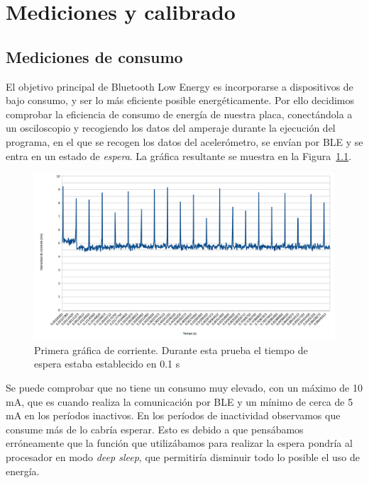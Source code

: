 \cleardoublepage

\chapter{Mediciones y calibrado}
\label{makereference7}

\section{Mediciones de consumo}

El objetivo principal de Bluetooth Low Energy es incorporarse a dispositivos de bajo consumo, y ser lo más eficiente posible energéticamente. Por ello decidimos comprobar la eficiencia de consumo de energía de nuestra placa, conectándola a un osciloscopio y recogiendo los datos del amperaje durante la ejecución del programa, en el que se recogen los datos del acelerómetro, se envían por BLE y se entra en un estado de \textit{espera}. La gráfica resultante se muestra en la Figura~\ref{figuraConsumoMayo}.

\begin{figure}[h]%
	\centering
    \includegraphics[width=\textwidth]{figures/consumo_mayo2.png}
    \caption[Primera gráfica de corriente]{Primera gráfica de corriente. Durante esta prueba el tiempo de espera estaba establecido en 0.1 s}
   	\label{figuraConsumoMayo}
\end{figure}

Se puede comprobar que no tiene un consumo muy elevado, con un máximo de 10 mA, que es cuando realiza la comunicación por BLE y un mínimo de cerca de 5 mA en los períodos inactivos. En los períodos de inactividad observamos que consume más de lo cabría esperar. Esto es debido a que pensábamos erróneamente que la función que utilizábamos para realizar la espera pondría al procesador en modo \textit{deep sleep}, que permitiría disminuir todo lo posible el uso de energía.

